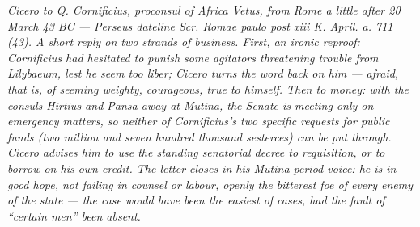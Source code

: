 
\textit{Cicero to Q. Cornificius, proconsul of Africa Vetus, from Rome a little after 20 March 43 BC ---
Perseus dateline \textit{Scr. Romae paulo post xiii K. April. a. 711 (43)}.
A short reply on two strands of business. First, an ironic reproof: Cornificius
had hesitated to punish some agitators threatening trouble from Lilybaeum, lest
he seem too \emph{liber}; Cicero turns the word back on him --- afraid, that is,
of seeming weighty, courageous, true to himself. Then to money: with the consuls
Hirtius and Pansa away at Mutina, the Senate is meeting only on emergency
matters, so neither of Cornificius's two specific requests for public funds (two
million and seven hundred thousand sesterces) can be put through. Cicero advises
him to use the standing senatorial decree to requisition, or to borrow on his
own credit. The letter closes in his Mutina-period voice: he is in good hope,
not failing in counsel or labour, openly the bitterest foe of every enemy of the
state --- the case would have been the easiest of cases, had the fault of
``certain men'' been absent.}

